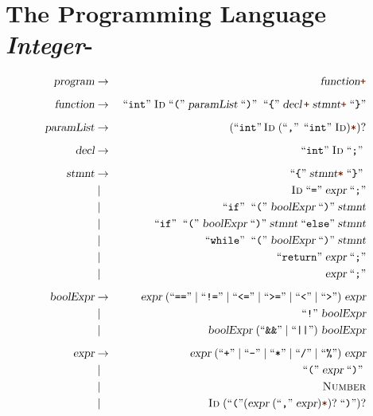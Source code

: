 \section{The Programming Language \textsl{Integer}-}
\begin{figure}[!ht]
  \begin{center}
  \begin{minipage}[t]{12.5cm}
  \begin{eqnarray*}    
\textsl{program}      & \rightarrow & \;\textsl{function}\mytt{+} \\[0.2cm]
\textsl{function}     & \rightarrow & \quoted{int} \textsc{Id} \quoted{(} \textsl{paramList} \quoted{)} \quoted{\{} \textsl{decl}\,\mytt{+}\; \textsl{stmnt}\mytt{+} \;\squoted{\}} \\[0.2cm]
\textsl{paramList}    & \rightarrow & \;(\squoted{int}\, \textsc{Id}\; (\squoted{,}\, \quoted{int} \textsc{Id})\mytt{*})?  \\[0.2cm]
\textsl{decl}  & \rightarrow & \quoted{int} \textsc{Id} \quoted{;}  \\[0.2cm]
\textsl{stmnt}    & \rightarrow & \quoted{\{} \textsl{stmnt}\mytt{*} \quoted{\}}  \\[0.0cm]
                      & \mid        & \;\textsc{Id} \quoted{=} \textsl{expr} \;\squoted{;} \\[0.0cm]
                      & \mid        &  \quoted{if} \quoted{(} \textsl{boolExpr} \quoted{)} \textsl{stmnt} \\[0.0cm]
                     & \mid         &  \quoted{if} \quoted{(} \textsl{boolExpr} \quoted{)} \textsl{stmnt} \quoted{else} \textsl{stmnt} \\[0.0cm]
                     & \mid        &  \quoted{while} \quoted{(} \textsl{boolExpr} \quoted{)} \textsl{stmnt} \\[0.0cm]
                     & \mid        &  \quoted{return} \textsl{expr}\; \squoted{;} \\[0.0cm]
                     & \mid        &  \;\textsl{expr} \;\squoted{;}               \\[0.2cm]
   \textsl{boolExpr} & \rightarrow & \textsl{expr} \;(\squoted{==} \mid \squoted{!=} \mid \squoted{<=} \mid \squoted{>=} \mid \squoted{<} \mid \squoted{>})\;  \textsl{expr} \\
         & \mid        &  \quoted{!} \textsl{boolExpr}             \\[0.0cm]
         & \mid        &  \textsl{boolExpr} \;(\squoted{\&\&} \mid \squoted{||})\; \textsl{boolExpr}   \\[0.2cm]
 \textsl{expr} & \rightarrow & \textsl{expr} \;(\squoted{+} \mid \squoted{-} \mid \squoted{*} \mid \squoted{/} \mid \squoted{\%})\; \textsl{expr} \\[0.0cm]
     & \mid        &  \quoted{(} \textsl{expr} \quoted{)}                 \\[0.0cm]
     & \mid        &  \textsc{Number}                             \\[0.0cm]
     & \mid        &  \textsc{Id}\; (\squoted{(} (\textsl{expr}\; (\squoted{,}\; \textsl{expr})\mytt{*})?\;\squoted{)})?  
  \end{eqnarray*}
  \vspace*{-0.5cm}


\end{minipage}
\end{center}
\end{figure}
